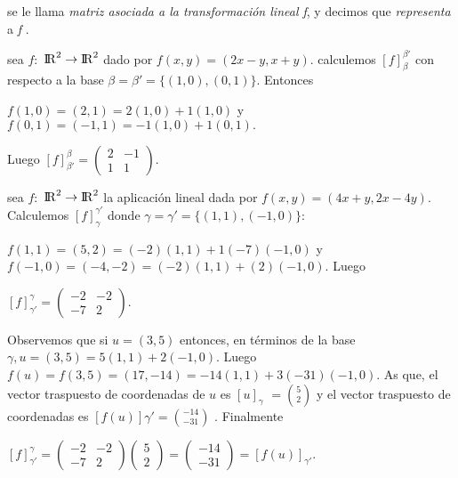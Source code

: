  		  se le llama \textit{matriz asociada a la transformación lineal f}, y decimos que\emph{ representa} a \textit{f} .
 		  
 		  \begin{ejem} sea $ f: $ ${\rm I\!R}^{2}\rightarrow {\rm I\!R}^{2}$ dado por $ f(x,y) = (2x - y,x + y) $. calculemos $ [f]^{\beta '}_{\beta} $ con respecto a la base $ \beta = \beta ' = \{(1,0), (0,1)\} $. Entonces 
 		  	\begin{center}
 		  		$f(1,0) = (2,1) = 2(1,0) + 1(1,0) $  y  \\
 		  	$f(0,1) = (-1,1) = -1(1,0) + 1(0,1).$
 		  	\end{center}
 	  	Luego $ [f]^{\beta}_{\beta '} =  \left( \begin{array}{cc}
 	 2 & -1 \\ 1 & 1
 	  	\end{array}\right). $ 
		   \end{ejem}	
 	  	 \begin{ejem} \label{ejemplo1.7} sea $ f: $ ${\rm I\!R}^{2}\rightarrow {\rm I\!R}^{2}$ la aplicación lineal dada por $ f(x,y) = (4x+y,2x-4y) $. Calculemos $ [f]^{\gamma '}_{\gamma} $ donde $ \gamma = \gamma ' = \{(1,1), (-1,0)\} $: 
 	  	 \begin{center}
 	  	 	$f(1,1) = (5,2) = (-2)(1,1) + 1(-7)(-1,0) $  y  \\
 	  	 	$f(-1,0) = (-4,-2) = (-2)(1,1) + (2)(-1,0).$ Luego
 	  	 	
 	  	 	$ [f]^{\gamma}_{\gamma '} =  \left( \begin{array}{cc}
 	  	 	-2 & -2 \\ -7 & 2
 	  	 	\end{array}\right). $ 
 	  	 \end{center}
 	  	 \end{ejem}
   	 	Observemos que si $ u = (3, 5) $ entonces, en términos de la base $ \gamma, u = (3, 5) = 5(1, 1) + 2(-1, 0) $. Luego $ f(u) = f(3,5) = (17, -14) = -14(1,1) + 3(-31)(-1, 0) $. As que, el vector traspuesto de coordenadas de $ u $ es $ [u]_{\gamma} $ $ = \binom{5}{2}$ y el vector traspuesto de coordenadas es $ [f (u)]\gamma ' = \binom{-14}{-31}$ . Finalmente 
   	 	 \begin{center}
   	 		$ [f]^{\gamma}_{\gamma '} =  \left( \begin{array}{cc}
   	 		-2 & -2 \\ -7 & 2
   	 		\end{array}\right) \left(\begin{array}{c}
   	 		5 \\ 2
   	 		\end{array}\right) = \left(\begin{array}{c}
   	 		-14 \\ -31
   	 		\end{array}\right) = [f(u)]_{\gamma '}$.
   	 	\end{center}
